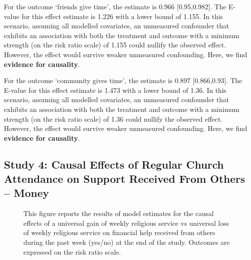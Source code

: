 \documentclass[
  single column]{article}
\begin{document}
For the outcome `friends give time', the estimate is 0.966
{[}0.95,0.982{]}. The E-value for this effect estimate is 1.226 with a
lower bound of 1.155. In this scenario, assuming all modelled
covariates, an unmeasured confounder that exhibits an association with
both the treatment and outcome with a minimum strength (on the risk
ratio scale) of 1.155 could nullify the observed effect. However, the
effect would survive weaker unmeasured confounding. Here, we find
\textbf{evidence for causality}.

For the outcome `community gives time', the estimate is 0.897
{[}0.866,0.93{]}. The E-value for this effect estimate is 1.473 with a
lower bound of 1.36. In this scenario, assuming all modelled covariates,
an unmeasured confounder that exhibits an association with both the
treatment and outcome with a minimum strength (on the risk ratio scale)
of 1.36 could nullify the observed effect. However, the effect would
survive weaker unmeasured confounding. Here, we find \textbf{evidence
for causality}.

\newpage{}

\subsection{Study 4: Causal Effects of Regular Church Attendance on
Support Received From Others --
Money}\label{study-4-causal-effects-of-regular-church-attendance-on-support-received-from-others-money}

\begin{figure}


\caption{\label{fig-4_1}This figure reports the results of model
estimates for the causal effects of a universal gain of weekly religious
service vs universal loss of weekly religious service on financial help
received from others during the past week (yes/no) at the end of the
study. Outcomes are expressed on the risk ratio scale.}

\end{figure}%
\end{document}
